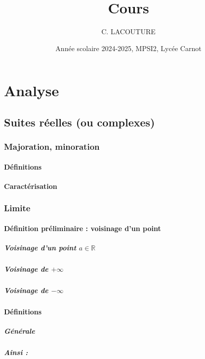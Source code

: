 \documentclass[12pt,a4paper,french]{book}
\title{Cours}
\author{C. LACOUTURE}
\date{Année scolaire 2024-2025, MPSI2, Lycée Carnot}
\begin{document}
\maketitle
\tableofcontents
\part{Analyse}
\chapter{Suites réelles (ou complexes)}
	\section{Majoration, minoration}
		\subsection{Définitions}
		\subsection{Caractérisation}
	\section{Limite}
		\subsection{Définition préliminaire : voisinage d'un point}
			\subsubsection{Voisinage d'un point $a \in \mathbb{R}$}
			\subsubsection{Voisinage de $+\infty$}
			\subsubsection{Voisinage de $-\infty$}
		\subsection{Définitions}
			\subsubsection{Générale}
			\subsubsection{Ainsi :}
\end{document}
